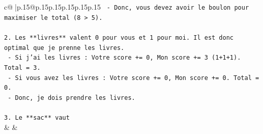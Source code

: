 \documentclass{article}
\begin{document}
{\begin{supertabular}{c@{$\;$}|p{.15\linewidth}@{}p{.15\linewidth}p{.15\linewidth}p{.15\linewidth}p{.15\linewidth}p{.15\linewidth}}
{{{\texttt{   {-} Donc, vous devez avoir le boulon pour maximiser le total (8 > 5).} \\
\\ 
\texttt{2. Les **livres** valent 0 pour vous et 1 pour moi. Il est donc optimal que je prenne les livres.} \\
\texttt{   {-} Si j'ai les livres : Votre score += 0, Mon score += 3 (1+1+1). Total = 3.} \\
\texttt{   {-} Si vous avez les livres : Votre score += 0, Mon score += 0. Total = 0.} \\
\texttt{   {-} Donc, je dois prendre les livres.} \\
\\ 
\texttt{3. Le **sac** vaut} \\
            }
        }
    }
    & & \\ \\


\end{supertabular}}
\end{document}

